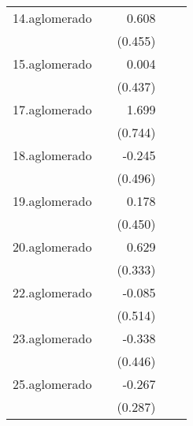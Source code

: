 {\begin{longtable}{l*{4}{D{.}{.}{-1}}}
\addlinespace
14.aglomerado&                     &       0.608         &                     &                     \\
            &                     &     (0.455)         &                     &                     \\
\addlinespace
15.aglomerado&                     &       0.004         &                     &                     \\
            &                     &     (0.437)         &                     &                     \\
\addlinespace
17.aglomerado&                     &       1.699\sym{*}  &                     &                     \\
            &                     &     (0.744)         &                     &                     \\
\addlinespace
18.aglomerado&                     &      -0.245         &                     &                     \\
            &                     &     (0.496)         &                     &                     \\
\addlinespace
19.aglomerado&                     &       0.178         &                     &                     \\
            &                     &     (0.450)         &                     &                     \\
\addlinespace
20.aglomerado&                     &       0.629         &                     &                     \\
            &                     &     (0.333)         &                     &                     \\
\addlinespace
22.aglomerado&                     &      -0.085         &                     &                     \\
            &                     &     (0.514)         &                     &                     \\
\addlinespace
23.aglomerado&                     &      -0.338         &                     &                     \\
            &                     &     (0.446)         &                     &                     \\
\addlinespace
25.aglomerado&                     &      -0.267         &                     &                     \\
            &                     &     (0.287)         &                     &                     \\

\end{longtable}}
